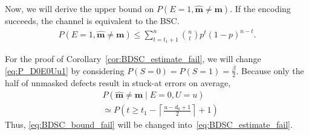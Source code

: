 \documentclass[10pt,twocolumn,twoside,submit]{JCNtran}
\begin{document}
	Now, we will derive the upper bound on $P(E=1, \widehat{\mathbf{m}} \ne \mathbf{m})$. If the encoding succeeds, the channel is equivalent to the BSC.
	\begin{align}
		P(E=1, \widehat{\mathbf{m}} \ne {\mathbf{m}}) \le \sum_{t=t_1 + 1}^{n}{\binom{n}{t}p^t (1-p)^{n-t}}. 
	\end{align}
	
	For the proof of Corollary~\ref{cor:BDSC_estimate_fail}, we will change \eqref{eq:P_D0E0Uu1} by considering $P(S=0) = P(S=1) = \frac{\beta}{2}$. Because only the half of unmasked defects result in stuck-at errors on average, 
	\begin{align}
	& {P(\widehat{\mathbf{m}} \ne {\mathbf{m}} \mid E=0, U=u)} \nonumber \\
	& \simeq P\left( t \ge t_1 - \left\lceil \frac{u -  d_0 + 1}{2} \right\rceil + 1 \right)  %
	\end{align}
	Thus, \eqref{eq:BDSC_bound_fail} will be changed into~\eqref{eq:BDSC_estimate_fail}.
	


%
%

\end{document}
